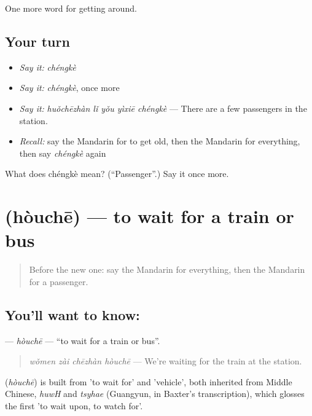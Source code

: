 \begin{grammarlens}[title={What you've built}]
One more word for getting around.
\end{grammarlens}

\subsection*{Your turn}
\begin{itemize}
\raggedright
  \item \emph{Say it:} \emph{chéngkè}
  \item \emph{Say it:} \emph{chéngkè}, once more
  \item \emph{Say it:} \emph{huǒchēzhàn lǐ yǒu yìxiē chéngkè} — There are a few passengers in the station.
  \item \emph{Recall:} say the Mandarin for to get old, then the Mandarin for everything, then say \emph{chéngkè} again
\end{itemize}

\begin{tcolorbox}[breakable,colback=teal!4,colframe=teal!35!black,title={Before you move on}]
What does chéngkè mean? (\textquotedblleft{}Passenger\textquotedblright{}.) Say it once more.
\end{tcolorbox}
\section[\texorpdfstring{\zh{候车} (hòuchē)}{候车 (hòuchē)}]{ (hòuchē) — to wait for a train or bus}

\label{lesson:ZH-C402-houche}



\begin{quote}
Before the new one: say the Mandarin for everything, then the Mandarin for a passenger.
\end{quote}

\subsection*{You'll want to know: }
\textbf{} — \emph{hòuchē} — \textquotedblleft{}to wait for a train or bus\textquotedblright{}.

\begin{quote}
\textbf{} \emph{wǒmen zài chēzhàn hòuchē} — We're waiting for the train at the station.
\end{quote}

\begin{cousinweb}
\textbf{} (\emph{hòuchē}) is built from  'to wait for' and  'vehicle', both inherited from Middle Chinese, \emph{huwH} and \emph{tsyhae} (Guangyun, in Baxter's transcription), which glosses the first 'to wait upon, to watch for'.
\end{cousinweb}

